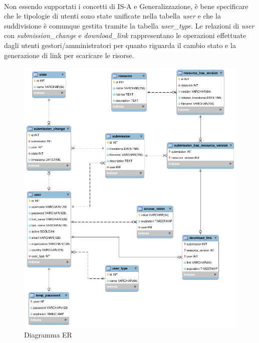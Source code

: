 \paragraph{}
Non essendo supportati i concetti di IS-A e Generalizzazione, è bene specificare
che le tipologie di utenti sono state unificate nella tabella \textit{user} e che
la suddivisione è comunque gestita tramite la tabella \textit{user\_type}.
Le relazioni di \textit{user} con \textit{submission\_change} e
\textit{download\_link} rappresentano le operazioni effettuate dagli utenti
gestori/amministratori per quanto riguarda il cambio stato e la generazione di
link per scaricare le risorse.

\begin{figure}[ht]
	\centering
	\includegraphics[width=\textwidth]{assets/diagrams/db-er-diagram.png}
	\caption{Diagramma ER}
	\label{fig:er-diagram}
\end{figure}